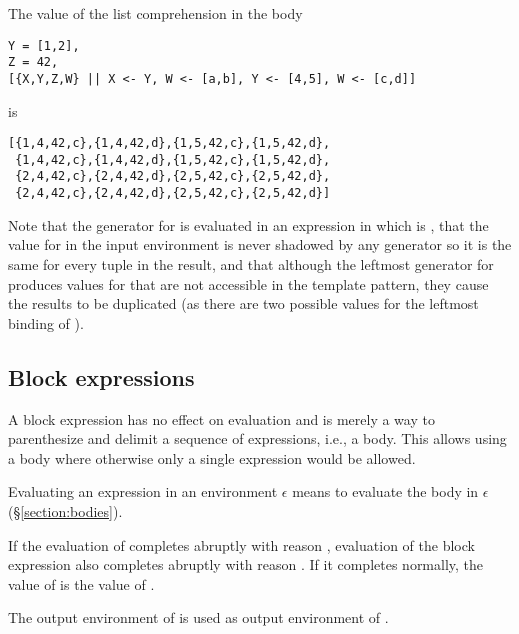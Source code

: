 \EXAMPLES

The value of the list comprehension in the body
\begin{verbatim}
Y = [1,2],
Z = 42,
[{X,Y,Z,W} || X <- Y, W <- [a,b], Y <- [4,5], W <- [c,d]]
\end{verbatim}
is
\begin{verbatim}
[{1,4,42,c},{1,4,42,d},{1,5,42,c},{1,5,42,d},
 {1,4,42,c},{1,4,42,d},{1,5,42,c},{1,5,42,d},
 {2,4,42,c},{2,4,42,d},{2,5,42,c},{2,5,42,d},
 {2,4,42,c},{2,4,42,d},{2,5,42,c},{2,5,42,d}]
\end{verbatim}
Note that the generator for  is evaluated in an expression in which  is \T{[1,2]},
that the value for  in the input environment is never shadowed by any generator so it is
the same for every tuple in the result, and that although the leftmost generator for 
produces values for  that are not accessible in the template pattern, they cause the
results to be duplicated (as there are two possible values for the leftmost binding of ).


\subsection{Block expressions}

\label{section:block-exprs}
A block expression has no effect on evaluation and is merely a way to
parenthesize and delimit a sequence of expressions, i.e., a body.  This allows
using a body where otherwise only a single expression would
be allowed.

\SYNTAX

\begin{rules}
       {  }
\end{rules}

\EVALUATION

Evaluating an expression  in an environment
$\epsilon$ means to evaluate the body  in $\epsilon$
(\S\ref{section:bodies}).

If the evaluation of  completes abruptly with reason ,
evaluation of the block expression also completes abruptly with reason
.  If it completes normally, the value of  is
the value of .

\ENVIRONMENTS

The output environment of  is used as output environment of
.

